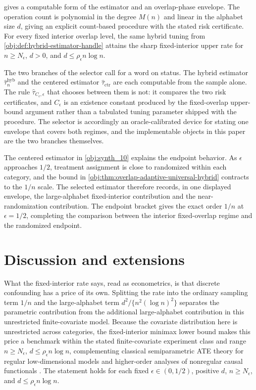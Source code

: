 \documentclass[11pt]{article}
\begin{document}
 gives a computable form of the estimator and an overlap-phase envelope. The operation count is polynomial in the degree \(M(n)\) and linear in the alphabet size \(d\), giving an explicit count-based procedure with the stated risk certificate. For every fixed interior overlap level, the same hybrid tuning from \cref{obj:def:hybrid-estimator-handle} attains the sharp fixed-interior upper rate for \(n\ge N_\epsilon\), \(d>0\), and \(d\le\rho_\epsilon n\log n\).

The two branches of the selector call for a word on status. The hybrid estimator \(\widehat\tau_n^{\mathrm{hyb}}\) and the centered estimator \(\widehat\tau_{\mathrm{ctr}}\) are each computable from the sample alone. The rule \(\widehat\tau_{C_\epsilon,\epsilon}\) that chooses between them is not: it compares the two risk certificates, and \(C_\epsilon\) is an existence constant produced by the fixed-overlap upper-bound argument rather than a tabulated tuning parameter shipped with the procedure. The selector is accordingly an oracle-calibrated device for stating one envelope that covers both regimes, and the implementable objects in this paper are the two branches themselves.

The centered estimator in \cref{obj:synth_10} explains the endpoint behavior. As \(\epsilon\) approaches \(1/2\), treatment assignment is close to randomized within each category, and the bound in \cref{obj:thm:overlap-adaptive-universal-hybrid} contracts to the \(1/n\) scale. The selected estimator therefore records, in one displayed envelope, the large-alphabet fixed-interior contribution and the near-randomization contribution. The endpoint bracket gives the exact order \(1/n\) at \(\epsilon=1/2\), completing the comparison between the interior fixed-overlap regime and the randomized endpoint.


\section{Discussion and extensions}

What the fixed-interior rate says, read as econometrics, is that discrete confounding has a price of its own. Splitting the rate into the ordinary sampling term \(1/n\) and the large-alphabet term \(d^2/\{n^2(\log n)^2\}\) separates the parametric contribution from the additional large-alphabet contribution in this unrestricted finite-covariate model. Because the covariate distribution here is unrestricted across categories, the fixed-interior minimax lower bound makes this price a benchmark within the stated finite-covariate experiment class and range \(n\ge N_\epsilon\), \(d\le\rho_\epsilon n\log n\), complementing classical semiparametric ATE theory for regular low-dimensional models \citep{Hahn1998,HiranoImbensRidder2003,RobinsRotnitzkyZhao1994,BangRobins2005,VanDerLaanRubin2006} and higher-order analyses of nonregular causal functionals \citep{Robins2008,Robins2009,Robins2017,LiuMukherjeeNeweyRobins2017,Kennedy2024}. The statement holds for each fixed \(\epsilon\in(0,1/2)\), positive \(d\), \(n\ge N_\epsilon\), and \(d\le\rho_\epsilon n\log n\).
\end{document}
